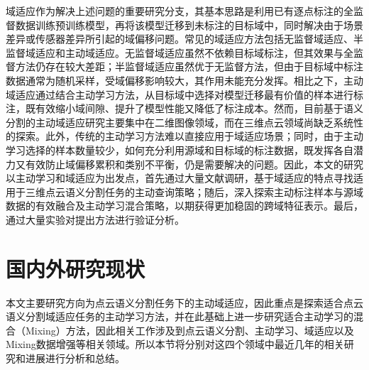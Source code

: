     域适应作为解决上述问题的重要研究分支，其基本思路是利用已有逐点标注的全监督数据训练预训练模型，再将该模型迁移到未标注的目标域中，同时解决由于场景差异或传感器差异所引起的域偏移问题。常见的域适应方法包括无监督域适应、半监督域适应和主动域适应。无监督域适应虽然不依赖目标域标注，但其效果与全监督方法仍存在较大差距；半监督域适应虽然优于无监督方法，但由于目标域中标注数据通常为随机采样，受域偏移影响较大，其作用未能充分发挥。相比之下，主动域适应通过结合主动学习方法，从目标域中选择对模型迁移最有价值的样本进行标注，既有效缩小域间隙、提升了模型性能又降低了标注成本。然而，目前基于语义分割的主动域适应研究主要集中在二维图像领域，而在三维点云领域尚缺乏系统性的探索。此外，传统的主动学习方法难以直接应用于域适应场景；同时，由于主动学习选择的样本数量较少，如何充分利用源域和目标域的标注数据，既发挥各自潜力又有效防止域偏移累积和类别不平衡，仍是需要解决的问题。因此，本文的研究以主动学习和域适应为出发点，首先通过大量文献调研，基于域适应的特点寻找适用于三维点云语义分割任务的主动查询策略；随后，深入探索主动标注样本与源域数据的有效融合及主动学习混合策略，以期获得更加稳固的跨域特征表示。最后，通过大量实验对提出方法进行验证分析。

\section{国内外研究现状}
本文主要研究方向为点云语义分割任务下的主动域适应，因此重点是探索适合点云语义分割域适应任务的主动学习方法，并在此基础上进一步研究适合主动学习的混合（Mixing）方法，因此相关工作涉及到点云语义分割、主动学习、域适应以及Mixing数据增强等相关领域。所以本节将分别对这四个领域中最近几年的相关研究和进展进行分析和总结。
